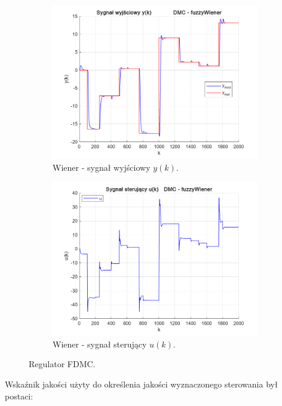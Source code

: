\begin{figure}[b!]
\begin{subfigure}[b]{0.49\paperwidth}
\centering
\includegraphics[width=\linewidth]{pictures/y_fuzzyWiener}
\caption{Wiener - sygnał wyjściowy $y(k)$.}
\end{subfigure}
\hfill
\begin{subfigure}[b]{0.49\paperwidth}
\centering
\includegraphics[width=\linewidth]{pictures/u_fuzzyWiener}
\caption{Wiener - sygnał sterujący $u(k)$.}
\end{subfigure}

\caption{Regulator FDMC.}
\end{figure}

\restoregeometry 
\newpage

Wskaźnik jakości użyty do określenia jakości wyznaczonego sterowania był postaci:

